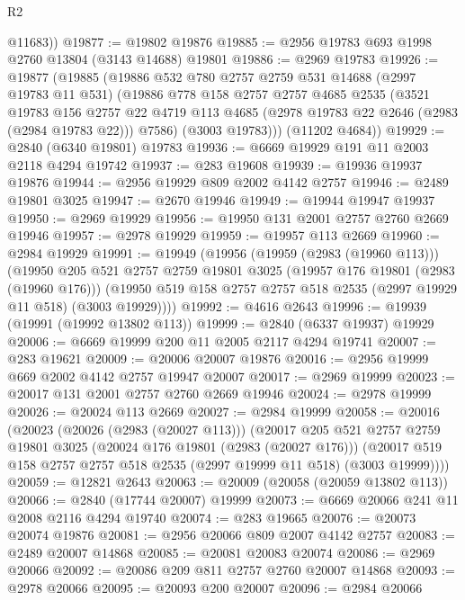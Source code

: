 \begin{lexlean}{R2}
\begin{coremodule}
        @11683))
@19877 := @19802 @19876
@19885 := @2956 @19783 @693 @1998 @2760 @13804 (@3143 @14688) @19801
@19886 := @2969 @19783
@19926 := @19877
    (@19885
      (@19886
        @532
        @780
        @2757
        @2759
        @531
        @14688
        (@2997 @19783 @11 @531)
        (@19886
          @778
          @158
          @2757
          @2757
          @4685
          @2535
          (@3521
            @19783
            @156
            @2757
            @22
            @4719
            @113
            @4685
            (@2978 @19783 @22 @2646 (@2983 (@2984 @19783 @22)))
            @7586)
          (@3003 @19783)))
      (@11202 @4684))
@19929 := @2840 (@6340 @19801) @19783
@19936 := @6669 @19929 @191 @11 @2003 @2118 @4294 @19742
@19937 := @283 @19608
@19939 := @19936 @19937 @19876
@19944 := @2956 @19929 @809 @2002 @4142 @2757
@19946 := @2489 @19801 @3025
@19947 := @2670 @19946
@19949 := @19944 @19947 @19937
@19950 := @2969 @19929
@19956 := @19950 @131 @2001 @2757 @2760 @2669 @19946
@19957 := @2978 @19929
@19959 := @19957 @113 @2669
@19960 := @2984 @19929
@19991 := @19949
    (@19956
      (@19959 (@2983 (@19960 @113)))
      (@19950
        @205
        @521
        @2757
        @2759
        @19801
        @3025
        (@19957 @176 @19801 (@2983 (@19960 @176)))
        (@19950 @519 @158 @2757 @2757 @518 @2535 (@2997 @19929 @11 @518) (@3003 @19929))))
@19992 := @4616 @2643
@19996 := @19939 (@19991 (@19992 @13802 @113))
@19999 := @2840 (@6337 @19937) @19929
@20006 := @6669 @19999 @200 @11 @2005 @2117 @4294 @19741
@20007 := @283 @19621
@20009 := @20006 @20007 @19876
@20016 := @2956 @19999 @669 @2002 @4142 @2757 @19947 @20007
@20017 := @2969 @19999
@20023 := @20017 @131 @2001 @2757 @2760 @2669 @19946
@20024 := @2978 @19999
@20026 := @20024 @113 @2669
@20027 := @2984 @19999
@20058 := @20016
    (@20023
      (@20026 (@2983 (@20027 @113)))
      (@20017
        @205
        @521
        @2757
        @2759
        @19801
        @3025
        (@20024 @176 @19801 (@2983 (@20027 @176)))
        (@20017 @519 @158 @2757 @2757 @518 @2535 (@2997 @19999 @11 @518) (@3003 @19999))))
@20059 := @12821 @2643
@20063 := @20009 (@20058 (@20059 @13802 @113))
@20066 := @2840 (@17744 @20007) @19999
@20073 := @6669 @20066 @241 @11 @2008 @2116 @4294 @19740
@20074 := @283 @19665
@20076 := @20073 @20074 @19876
@20081 := @2956 @20066 @809 @2007 @4142 @2757
@20083 := @2489 @20007 @14868
@20085 := @20081 @20083 @20074
@20086 := @2969 @20066
@20092 := @20086 @209 @811 @2757 @2760 @20007 @14868
@20093 := @2978 @20066
@20095 := @20093 @200 @20007
@20096 := @2984 @20066

\end{coremodule}
\end{lexlean}
